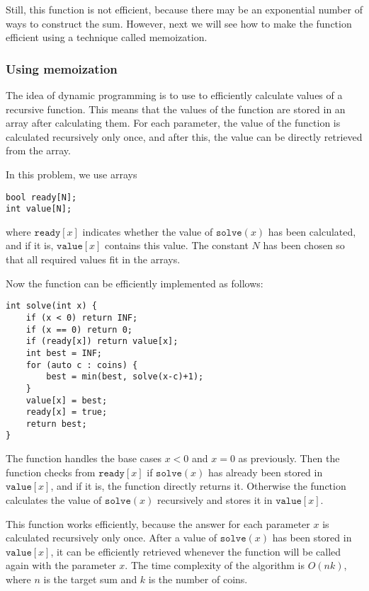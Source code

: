 Still, this function is not efficient,
because there may be an exponential number of ways
to construct the sum.
However, next we will see how to make the
function efficient using a technique called memoization.

\subsubsection{Using memoization}


The idea of dynamic programming is to use
 to efficiently calculate
values of a recursive function.
This means that the values of the function
are stored in an array after calculating them.
For each parameter, the value of the function
is calculated recursively only once, and after this,
the value can be directly retrieved from the array.

In this problem, we use arrays
\begin{lstlisting}
bool ready[N];
int value[N];
\end{lstlisting}

where $\texttt{ready}[x]$ indicates
whether the value of $\texttt{solve}(x)$ has been calculated,
and if it is, $\texttt{value}[x]$
contains this value.
The constant $N$ has been chosen so
that all required values fit in the arrays.

Now the function can be efficiently
implemented as follows:

\begin{lstlisting}
int solve(int x) {
    if (x < 0) return INF;
    if (x == 0) return 0;
    if (ready[x]) return value[x];
    int best = INF;
    for (auto c : coins) {
        best = min(best, solve(x-c)+1);
    }
    value[x] = best;
    ready[x] = true;
    return best;
}
\end{lstlisting}

The function handles the base cases
$x<0$ and $x=0$ as previously.
Then the function checks from
$\texttt{ready}[x]$ if
$\texttt{solve}(x)$ has already been stored
in $\texttt{value}[x]$,
and if it is, the function directly returns it.
Otherwise the function calculates the value
of $\texttt{solve}(x)$
recursively and stores it in $\texttt{value}[x]$.

This function works efficiently,
because the answer for each parameter $x$
is calculated recursively only once.
After a value of $\texttt{solve}(x)$ has been stored in $\texttt{value}[x]$,
it can be efficiently retrieved whenever the
function will be called again with the parameter $x$.
The time complexity of the algorithm is $O(nk)$,
where $n$ is the target sum and $k$ is the number of coins.

